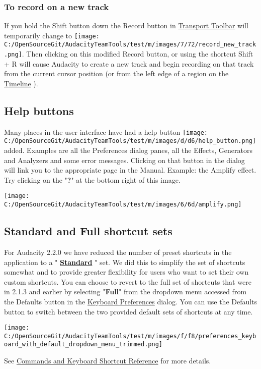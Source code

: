 \begin{multicols}{2}
\subsubsection{To record on a new track}If you hold the Shift button down the Record button in 
\hyperref[\foo{transport:toolbar:}]{Transport Toolbar}
 will temporarily change to \protect\texttt{[image: C:/OpenSourceGit/AudacityTeamTools/test/m/images/7/72/record\_new\_track.png]}. Then clicking on this modified Record button, or using the shortcut Shift + R will cause Audacity to create a new track and begin recording on that track from the current cursor position (or from the left edge of a region on the 
\hyperref[\foo{timeline:}]{Timeline}
). 

\subsection{Help buttons}
\label{new:features:in:this:release:help-buttons}Many places in the user interface have had a help button \protect\texttt{[image: C:/OpenSourceGit/AudacityTeamTools/test/m/images/d/d6/help\_button.png]} added. Examples are all the Preferences dialog panes, all the Effects, Generators and Analyzers and some error messages.
Clicking on that button in the dialog will link you to the appropriate page in the Manual.
Example: the Amplify effect.  Try clicking on the "\textbf{?}" at the bottom right of this image.
\par \protect\texttt{[image: C:/OpenSourceGit/AudacityTeamTools/test/m/images/6/6d/amplify.png]}\par 
\subsection{Standard and Full shortcut sets}
\label{new:features:in:this:release:shortcuts}For Audacity 2.2.0 we have reduced the number of preset shortcuts in the application to a "\textbf{
\hyperref[\foo{keyboard:shortcut:reference:}]{Standard}
}" set.  We did this to simplify the set of shortcuts somewhat and to provide greater flexibility for users who want to set their own custom shortcuts.
You can choose to revert to the full set of shortcuts that were in 2.1.3 and earlier by selecting "\textbf{Full}" from the dropdown menu accessed from the Defaults button in the 
\hyperref[\foo{keyboard:preferences:}]{Keyboard Preferences}
 dialog.
You can use the Defaults button to switch between the two provided default sets of shortcuts at any time.
\par \protect\texttt{[image: C:/OpenSourceGit/AudacityTeamTools/test/m/images/f/f8/preferences\_keyboard\_with\_default\_dropdown\_menu\_trimmed.png]}\par See 
\hyperref[\foo{keyboard:shortcut:reference:}]{Commands and Keyboard Shortcut Reference}
 for more details.


\end{multicols}

